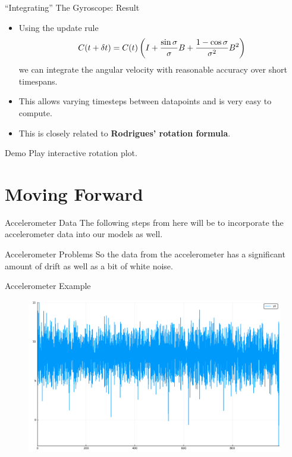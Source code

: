 \documentclass[10pt]{beamer}
\begin{document}
\begin{frame}{``Integrating'' The Gyroscope: Result}
  \begin{itemize}
  \item Using the update rule
    \[C(t + \delta t) = C(t)\del{I + \frac{\sin \sigma}{\sigma}B + \frac{1 - \cos\sigma}{\sigma^2}B^2}\]
    we can integrate the angular velocity with reasonable accuracy over short timespans.
  \item This allows varying timesteps between datapoints and is very easy to compute.
  \item This is closely related to \textbf{Rodrigues' rotation formula}.
  \end{itemize}
\end{frame}

\begin{frame} {Demo}
Play interactive rotation plot.
\end{frame}

\section{Moving Forward}

\begin{frame} {Accelerometer Data}
The following steps from here will be to incorporate the accelerometer data into our models as well.
\end{frame}

\begin{frame} {Accelerometer Problems}
So the data from the accelerometer has a significant amount of drift as well as a bit of white noise.
\end{frame}

\begin{frame} {Accelerometer Example}
\begin{figure}
\includegraphics[width=\linewidth,height=\textheight,keepaspectratio]{images/accel_z}
\end{figure}
\end{frame}
\end{document}
